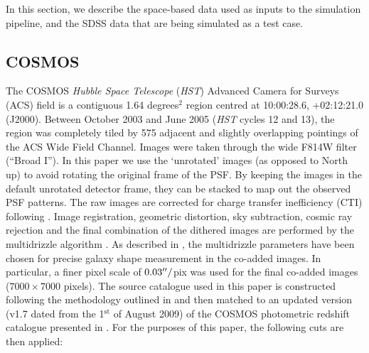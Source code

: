 \documentclass[twocolumn,useAMS,usenatbib]{mn2e}
\newcommand{\newtext}{}
\begin{document}
In this section, we describe the space-based data used as inputs to
the simulation pipeline, and the SDSS data that are being simulated as
a test case.

\subsection{COSMOS}\label{SS:cosmos}

The COSMOS {\it Hubble Space Telescope} ({\it HST}) Advanced Camera for Surveys (ACS) field
\citep{2007ApJS..172..196K,2007ApJS..172....1S,2007ApJS..172...38S} is
a contiguous 1.64 degrees$^2$ region centred at 10:00:28.6, +02:12:21.0
(J2000).  Between October 2003 and June 2005 ({\it HST} cycles 12 and 13),
the region was completely tiled by 575 adjacent and slightly
overlapping pointings of the ACS Wide Field Channel. Images were taken through the
wide F814W filter (``Broad I''). In this paper we use the
`unrotated' images (as opposed to North up) to avoid rotating the
original frame of the PSF. By keeping the images in the default
unrotated detector frame, they can be stacked to map out the observed
PSF patterns. The raw images are corrected for charge transfer
inefficiency (CTI) following \citet{2010MNRAS.401..371M}. Image
registration, geometric distortion, sky subtraction, cosmic ray
rejection and the final combination of the dithered images are
performed by the multidrizzle algorithm \citep{2002hstc.conf..337K}. As
described in \citet{2007ApJS..172..203R}, the multidrizzle parameters
have been chosen for precise galaxy shape measurement in the co-added
images. In particular, a finer pixel scale of $0.03\hbox{$^{\prime\prime}$}/$pix was
used for the final co-added images ($7000\times 7000$ pixels). The source
catalogue used in this paper is constructed following the methodology
outlined in \citet{2007ApJS..172..219L} and then matched to \newtext{an updated version
(v1.7 dated from the 1$^\mathrm{st}$ of August 2009) of} the COSMOS
photometric redshift catalogue presented in \citet{2009ApJ...690.1236I}. For the
purposes of this paper, the following cuts are then applied:
\end{document}
